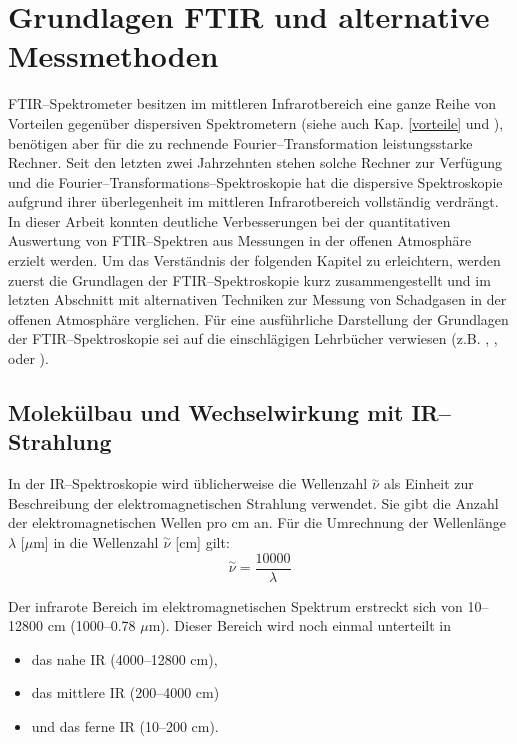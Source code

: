 \chapter{\label{grundlagen}Grundlagen FTIR und alternative Messmethoden}

FTIR--Spektrometer besitzen im mittleren Infrarotbereich eine
ganze Reihe von Vorteilen gegenüber dispersiven Spektrometern
(siehe auch Kap. \ref{vorteile} und \cite{griffiths77}), benötigen
aber für die zu rechnende Fourier--Transformation leistungsstarke
Rechner. Seit den letzten zwei Jahrzehnten stehen solche Rechner
zur Verfügung und die Fourier--Transformations--Spektroskopie hat
die dispersive Spektroskopie aufgrund ihrer überlegenheit im
mittleren Infrarotbereich vollständig verdrängt. In dieser Arbeit
konnten deutliche Verbesserungen bei der quantitativen Auswertung
von FTIR--Spektren aus Messungen in der offenen Atmosphäre erzielt
werden. Um das Verständnis der folgenden Kapitel zu erleichtern,
werden zuerst die Grundlagen der FTIR--Spektroskopie kurz
zusammengestellt und im letzten Abschnitt mit alternativen
Techniken zur Messung von Schadgasen in der offenen Atmosphäre
verglichen. Für eine ausführliche Darstellung der Grundlagen der
FTIR--Spektroskopie sei auf die einschlägigen Lehrbücher verwiesen
(z.B. \cite{griffiths86}, \cite{günzler96}, \cite{gottwald97} oder
\cite{schrader95}).

\section{\label{molekuelbau}Molekülbau und Wechselwirkung mit
 IR--\-Strahl\-ung}

In der IR--Spektroskopie wird üblicherweise die Wellenzahl
$\stackrel{\sim}{\nu}$ als Einheit zur Beschreibung der
elektromagnetischen Strahlung verwendet. Sie gibt die Anzahl der
elektromagnetischen Wellen pro cm an. Für die Umrechnung der
Wellenlänge $\lambda$ [$\mu$m] in die Wellenzahl
$\stackrel{\sim}{\nu}$ [cm] gilt:
\begin{equation}\label{eqlanu}
  \stackrel{\sim}{\nu}=\frac{10000}{\lambda}
\end{equation}

Der infrarote Bereich im elektromagnetischen Spektrum erstreckt
sich von 10--12800 cm (1000--0.78 $\mu$m). Dieser Bereich
wird noch einmal unterteilt in
\begin{itemize}
  \item das nahe IR (4000--12800 cm),
  \item das mittlere IR (200--4000 cm)
  \item und das ferne IR (10--200 cm).
\end{itemize}


